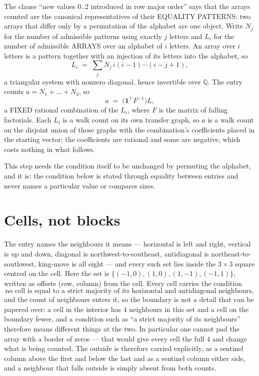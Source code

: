 \documentclass[11pt,a4paper]{article}
\theoremstyle{plain}
\theoremstyle{definition}
\begin{document}
The clause ``new values $0..2$ introduced in row major order'' says that the arrays
counted are the canonical representatives of their EQUALITY PATTERNS: two arrays that differ
only by a permutation of the alphabet are one object. Write $N_j$ for the number of admissible
patterns using exactly $j$ letters and $L_i$ for the number of admissible ARRAYS over an
alphabet of $i$ letters. An array over $i$ letters is a pattern together with an injection of
its letters into the alphabet, so
\[
L_i\;=\;\sum_{j}N_j\,i(i-1)\cdots(i-j+1),
\]
a triangular system with nonzero diagonal, hence invertible over $\mathbb{Q}$. The entry
counts $a=N_1+\dots+N_{3}$, so
\[
a\;=\;\bigl(\mathbf{1}^{\!\top}F^{-1}\bigr)L ,
\]
a FIXED rational combination of the $L_i$, where $F$ is the matrix of falling factorials.
Each $L_i$ is a walk count on its own transfer graph, so $a$ is a walk count on the disjoint
union of those graphs with the combination's coefficients placed in the starting vector; the
coefficients are rational and some are negative, which costs nothing in what follows.

This step needs the condition itself to be unchanged by permuting the alphabet, and it is:
the condition below is stated through equality between entries and never names a particular
value or compares sizes.

\section{Cells, not blocks}

The entry names the neighbours it means --- horizontal is left and right, vertical is up and
down, diagonal is northwest-to-southeast, antidiagonal is northeast-to-southwest, king-move is
all eight --- and every such set lies inside the $3\times3$ square centred on the cell. Here
the set is $\{(-1,0), (1,0), (1,-1), (-1,1)\}$, written as offsets (row, column) from the cell. Every cell carries
the condition
\[
\text{no cell is equal to a strict majority of its horizontal and antidiagonal neighbours},
\]
and the count of neighbours enters it, so the boundary is not a detail that can be papered
over: a cell in the interior has $4$ neighbours in this set and a cell on the boundary
fewer, and a condition such as ``a strict majority of its neighbours'' therefore means
different things at the two. In particular one cannot pad the array with a border of zeros ---
that would give every cell the full $4$ and change what is being counted. The outside is
therefore carried
explicitly, as a sentinel column above the first and below the last and as a sentinel column
either side, and a neighbour that falls outside is simply absent from both counts.
\end{document}
